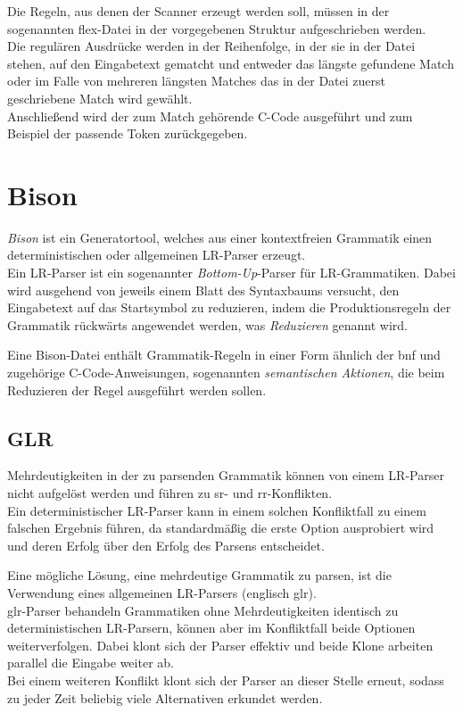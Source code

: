 \documentclass[oneside]{ausarbeitung}
\begin{document}
Die Regeln, aus denen der Scanner erzeugt werden soll, müssen in der sogenannten flex-Datei in der vorgegebenen Struktur aufgeschrieben werden. \\
Die regulären Ausdrücke werden in der Reihenfolge, in der sie in der Datei stehen, auf den Eingabetext gematcht und entweder das längste gefundene Match oder im Falle von mehreren längsten Matches das in der Datei zuerst geschriebene Match wird gewählt. \\
Anschließend wird der zum Match gehörende C-Code ausgeführt und zum Beispiel der passende Token zurückgegeben.\cite{Herold:lexYacc} \cite{Bantel:compilerbau}
	


	
\section{Bison}

\textit{Bison} ist ein Generatortool, welches aus einer kontextfreien Grammatik einen deterministischen oder allgemeinen LR-Parser erzeugt. \\
Ein LR-Parser ist ein sogenannter \textit{Bottom-Up}-Parser für LR-Grammatiken. Dabei wird ausgehend von jeweils einem Blatt des Syntaxbaums versucht, den Eingabetext auf das Startsymbol zu reduzieren, indem die Produktionsregeln der Grammatik rückwärts angewendet werden, was \textit{Reduzieren} genannt wird. \cite{Bantel:compilerbau} \cite{GNU:Bison}

Eine Bison-Datei enthält Grammatik-Regeln in einer Form ähnlich der \ac{bnf} und zugehörige C-Code-Anweisungen, sogenannten \textit{semantischen Aktionen}, die beim Reduzieren der Regel ausgeführt werden sollen. 


	
\subsection{GLR}
	
Mehrdeutigkeiten in der zu parsenden Grammatik können von einem LR-Parser nicht aufgelöst werden und führen zu \ac{sr}- und \ac{rr}-Konflikten. \\
Ein deterministischer LR-Parser kann in einem solchen Konfliktfall zu einem falschen Ergebnis führen, da standardmäßig die erste Option ausprobiert wird und deren Erfolg über den Erfolg des Parsens entscheidet.

\pagebreak

Eine mögliche Lösung, eine mehrdeutige Grammatik zu parsen, ist die Verwendung eines allgemeinen LR-Parsers (englisch \ac{glr}). \\
\ac{glr}-Parser behandeln Grammatiken ohne Mehrdeutigkeiten identisch zu deterministischen LR-Parsern, können aber im Konfliktfall beide Optionen weiterverfolgen. Dabei klont sich der Parser effektiv und beide Klone arbeiten parallel die Eingabe weiter ab. \\
Bei einem weiteren Konflikt klont sich der Parser an dieser Stelle erneut, sodass zu jeder Zeit beliebig viele Alternativen erkundet werden. 
\end{document}
